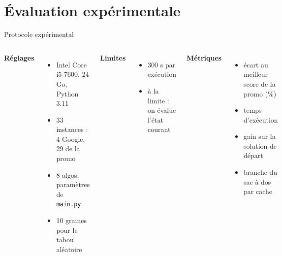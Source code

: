 \documentclass[aspectratio=169,11pt]{beamer}
\begin{document}
\section{Évaluation expérimentale}

\begin{frame}{Protocole expérimental}
  \begin{columns}[T]
    \textbf{Réglages}
    \begin{itemize}
      \item Intel Core i5-7600, 24 Go, Python 3.11
      \item 33 instances : 4 Google, 29 de la promo
      \item 8 algos, paramètres de \texttt{main.py}
      \item 10 graines pour le tabou aléatoire
    \end{itemize}
    \textbf{Limites}
    \begin{itemize}
      \item 300 s par exécution
      \item à la limite : on évalue l'état courant
    \end{itemize}
    \textbf{Métriques}
    \begin{itemize}
      \item écart au meilleur score de la promo (\%)
      \item temps d'exécution
      \item gain sur la solution de départ
      \item branche du sac à dos par cache
    \end{itemize}
  \end{columns}
\end{frame}
\end{document}
